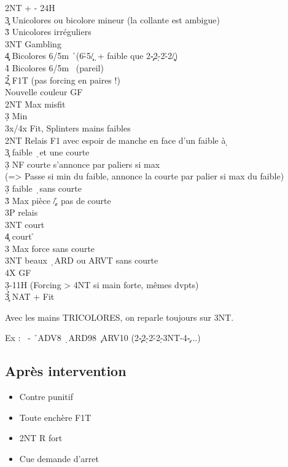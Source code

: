 \documentclass[a4paper]{article}
\begin{document}
\begin{bidtable}
2NT + - 24H\\
3\c\d \> Unicolores ou bicolore mineur (la collante est ambigue)\\
3\h\s \> Unicolores irréguliers\\
3NT \> Gambling \c \\
4\c\d \> Bicolores 6/5m \h\ (6\h -5\c /\d\ + faible que 2\c -2\d -2\h -2\c /\d )\\
4\h\s \> Bicolores 6/5m \s\ (pareil)\-\\
2\h{}\c \> F1T (pas forcing en paires !)\\
\>Nouvelle couleur GF\+\\
2NT \> Max misfit\\
3\d \> Min\\
3x/4x \> Fit, Splinters mains faibles\-\\
2NT \> Relais F1 avec espoir de manche en face d’un faible à \d \+\\
3\c \> faible \d\ et une courte\+\\
3\d \> NF courte s’annonce par paliers si max\\
\>(=> Passe si min du faible, annonce la courte par palier si max du faible)\-\\
3\d \> faible \d\ sans courte\\
3\h \> Max pièce \c /\h , pas de courte\+\\
3P \> relais\+\\
3NT \> court \c \\
4\c \> court \h \-\-\\
3\s \> Max force sans courte\\
3NT \> beaux \d\ ARD ou ARVT sans courte\\
4X \> GF\-\\
3\d {}-11H (Forcing > 4NT si main forte, mêmes dvpts)\\
3\h{}\c \> NAT + Fit\-
\end{bidtable}

Avec les mains TRICOLORES, on reparle toujours sur 3NT.

Ex : \s\ - \h\ ADV8 \d\ ARD98 \c\ ARV10
(2\c -2\d -2\h -2\d -3NT-4\c -...)

\subsection{Après intervention}

\begin{itemize}
\item Contre punitif

\item Toute enchère F1T

\item 2NT R fort

\item Cue demande d'arret

\end{itemize}
\end{document}
